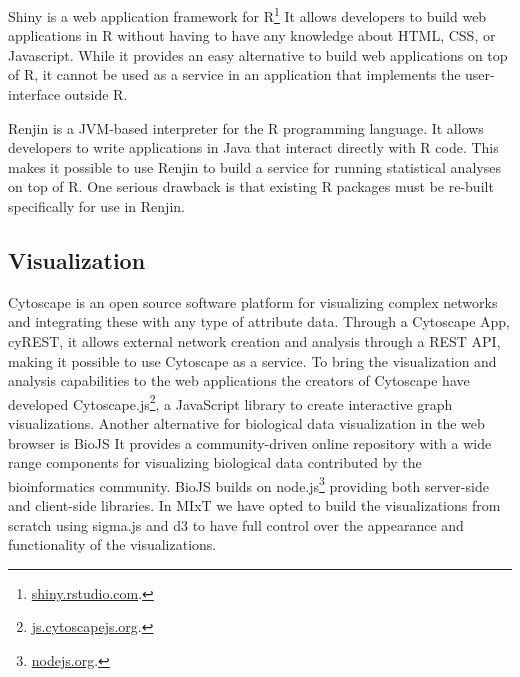Shiny is a web application framework for R\footnote{\url{shiny.rstudio.com}.}
It allows developers to build web applications in R without having to have any
knowledge about HTML, CSS, or Javascript. While it provides an easy alternative
to build web applications on top of R, it cannot be used as a service in an
application that implements the user-interface outside R.  

Renjin is a JVM-based interpreter for the R programming language.\cite{renjin}
It allows developers to write applications in Java that interact directly with R
code. This makes it possible to use Renjin to build a service for running
statistical analyses on top of R. One serious drawback is that existing R
packages must be re-built specifically for use in Renjin. 

\subsection*{Visualization} 
Cytoscape is an open source software platform for visualizing complex networks
and integrating these with any type of attribute
data.\cite{shannon2003cytoscape} Through a Cytoscape App, cyREST, it allows
external network creation and analysis through a REST API\cite{ono2015cyrest},
making it possible to use Cytoscape as a service.  To bring the visualization
and analysis capabilities to the web applications the creators of Cytoscape have
developed Cytoscape.js\footnote{\url{js.cytoscapejs.org}.}, a JavaScript library
to create interactive graph visualizations.  Another alternative for biological
data visualization in the web browser is BioJS It provides a community-driven
online repository with a wide range components for visualizing biological data
contributed by the bioinformatics community.\cite{gomez2013biojs} BioJS builds
on node.js\footnote{\url{nodejs.org}.} providing both server-side and
client-side libraries. In MIxT we have opted to build the visualizations from
scratch using sigma.js and d3 to have full control over the appearance and
functionality of the visualizations. 

